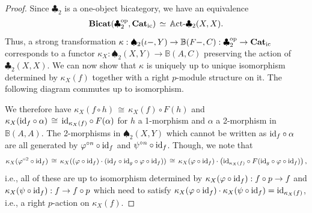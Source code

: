 \documentclass[12pt,oneside,reqno,a4paper]{article}
\theoremstyle{definition}
\newcommand{\op}{^\textup{op}}
\newcommand{\Catic}{\textbf{\textup{Cat}}_\textup{ic}}
\newcommand{\Bicat}{\textbf{\textup{Bicat}}}
\newcommand{\rAct}[1]{\mathbb{A}\textup{ct-}#1}
\newcommand{\clb}{\clubsuit}
\newcommand{\spd}{\spadesuit}
\renewcommand{\phi}{\varphi}
\newcommand{\iso}{\,\cong\,}
\renewcommand{\equiv}{\,\simeq\,}
\newcommand{\id}{\textup{id}}
\newcommand{\bB}{\mathbb{B}}
\begin{document}
\begin{proof}
Since $\clb_2$ is a one-object bicategory, we have an equivalence
\begin{align*}
\Bicat(\clb_2\op,\Catic)\equiv\rAct{\clb_2(X,X)}.
\end{align*}
Thus, a strong transformation $\kappa:\spd_2(\iota -, Y)\to \bB(F-,C):\clb_2\op\to\Catic$ corresponds to a functor $\kappa_X:\spd_2(X, Y)\to \bB(A,C)$ preserving the action of $\clb_2(X,X)$. We can now show that $\kappa$ is uniquely up to unique isomorphism determined by $\kappa_X(f)$ together with a right $p$-module structure on it. The following diagram commutes up to isomorphism.
\begin{center}
\end{center}
We therefore have $\kappa_X(f\circ h)\iso\kappa_X(f) \circ F(h)$ and $\kappa_X(\id_f\circ \alpha)\iso \id_{\kappa_X(f)}\circ F(\alpha)$ for $h$ a 1-morphism and $\alpha$ a 2-morphism in $\bB(A,A)$. The 2-morphisms in $\spd_2(X,Y)$ which cannot be written as $\id_f \circ \alpha$ are all generated by $\phi^{\circ n}\circ \id_f$ and $\psi^{\circ n}\circ \id_f$. Though, we note that
\begin{align*}
\kappa_X(\phi^{\circ 2}\circ \id_f)\iso \kappa_X((\phi\circ \id_f)\cdot (\id_f\circ\id_g\circ\phi\circ\id_f))\iso \kappa_X(\phi\circ \id_f)\cdot \left(\id_{\kappa_X(f)}\circ F(\id_g\circ \phi\circ \id_f)\right),
\end{align*}
i.e., all of these are up to isomorphism determined by $\kappa_X(\phi\circ \id_f):f\circ p\to f$ and $\kappa_X(\psi\circ \id_f):f\to f\circ p$ which need to satisfy $\kappa_X(\phi\circ \id_f)\cdot\kappa_X(\psi\circ \id_f)=\id_{\kappa_X(f)}$, i.e., a right $p$-action on $\kappa_X(f)$.


\end{proof}
\end{document}
